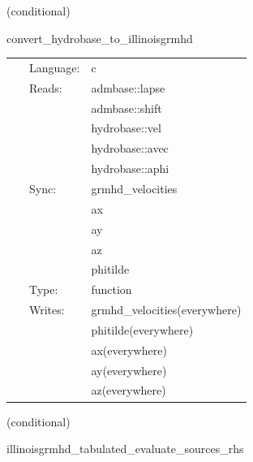    (conditional) 

\hspace{5mm} convert\_hydrobase\_to\_illinoisgrmhd 

\hspace{5mm}{\it convert hydrobase initial data (id) to illinoisgrmhd variables } 


\hspace{5mm}

 \begin{tabular*}{160mm}{cll} 
~ & Language:  & c \\ 
~ & Reads:  & admbase::lapse \\ 
~& ~ &admbase::shift\\ 
~& ~ &hydrobase::vel\\ 
~& ~ &hydrobase::avec\\ 
~& ~ &hydrobase::aphi\\ 
~ & Sync:  & grmhd\_velocities \\ 
~& ~ &ax\\ 
~& ~ &ay\\ 
~& ~ &az\\ 
~& ~ &phitilde\\ 
~ & Type:  & function \\ 
~ & Writes:  & grmhd\_velocities(everywhere) \\ 
~& ~ &phitilde(everywhere)\\ 
~& ~ &ax(everywhere)\\ 
~& ~ &ay(everywhere)\\ 
~& ~ &az(everywhere)\\ 
\end{tabular*} 


\vspace{5mm}

   (conditional) 

\hspace{5mm} illinoisgrmhd\_tabulated\_evaluate\_sources\_rhs 

\hspace{5mm}{\it tabulated version of illinoisgrmhd\_evaluate\_sources\_rhs } 


\hspace{5mm}

